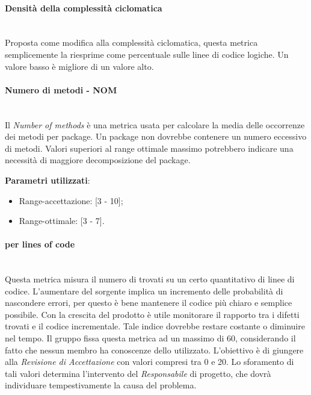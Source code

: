 			\paragraph{Densità della complessità ciclomatica}\mbox{} \\

			Proposta come modifica alla complessità ciclomatica, questa metrica semplicemente la riesprime come percentuale sulle linee di codice logiche. Un valore basso è migliore di un valore alto.
			

			\paragraph{Numero di metodi - NOM}\mbox{} \\
				
			Il \emph{Number of methods} è una metrica usata per calcolare la media delle occorrenze dei metodi per package. Un package non dovrebbe contenere un numero eccessivo di metodi. Valori superiori al range ottimale massimo potrebbero indicare una necessità di maggiore decomposizione del package.
			
			\textbf{Parametri utilizzati}:
			\begin{itemize}
				\item Range-accettazione: [3 - 10];
				\item Range-ottimale: [3 - 7].
			\end{itemize}

			
			\paragraph{ per lines of code}\mbox{} \\
			
			Questa metrica misura il numero di  trovati su un certo quantitativo di linee di codice. L'aumentare del sorgente implica un incremento delle probabilità di nascondere errori, per questo è bene mantenere il codice più chiaro e semplice possibile. Con la crescita del prodotto è utile monitorare il rapporto tra i difetti trovati e il codice incrementale. Tale indice dovrebbe restare costante o diminuire nel tempo.
			Il gruppo fissa questa metrica ad un massimo di 60, considerando il fatto che nessun membro ha conoscenze dello  utilizzato. L’obiettivo è di giungere alla \textit{Revisione di Accettazione} con valori compresi tra 0 e 20. Lo sforamento di tali valori determina l’intervento del \textit{Responsabile} di progetto, che dovrà individuare tempestivamente la causa del problema.



